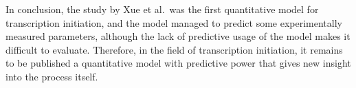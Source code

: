 In conclusion, the study by Xue et al.\ was the first quantitative model for
transcription initiation, and the model managed to predict some experimentally
measured parameters, although the lack of predictive usage of the model makes
it difficult to evaluate. Therefore, in the field of transcription initiation,
it remains to be published a quantitative model with predictive power that
gives new insight into the process itself.

